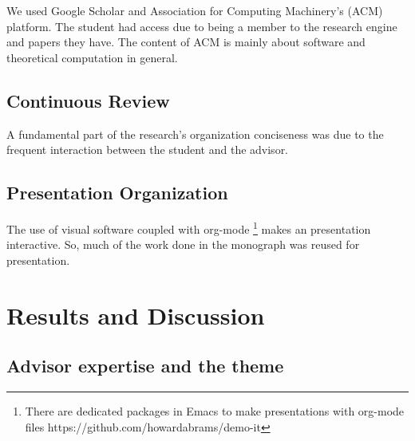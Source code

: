 \documentclass[
12pt,				%
openright,			%
oneside,			%
a4paper,			%
brazil,				%
english,			  %
]{abntex2}
\begin{document}
We used Google Scholar and Association for Computing Machinery's (ACM)
platform. The student had access due to being a member to the research
engine and papers they have. The content of ACM is mainly about
software and theoretical computation in general. 

\section{Continuous Review}
A fundamental part of the research's organization conciseness was due
to the frequent interaction between the student and the advisor.

\section{Presentation Organization}
The use of visual software coupled with org-mode \footnote{There are
  dedicated packages in Emacs to make presentations with org-mode
  files https://github.com/howardabrams/demo-it} makes an presentation
interactive. So, much of the work done in the monograph was reused for presentation.

\chapter{Results and Discussion}

\section{Advisor expertise and the theme}
\end{document}
